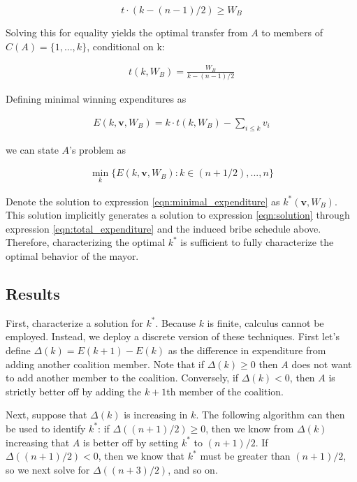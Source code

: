 \documentclass[12pt,a4paper]{article}
\begin{document}
$$t \cdot (k - (n - 1)/2) \geq W_B$$

Solving this for equality yields the optimal transfer from $A$ to members of $C(A) = \{1, ..., k\}$, conditional on k:

\begin{align}
    \label{eqn:common_transfer}
    t(k, W_B) = \frac{W_B}{k - (n - 1)/2}
\end{align}

Defining minimal winning expenditures as

\begin{align}
    \label{eqn:total_expenditure}
    E(k, \mathbf{v}, W_B) = k \cdot t(k, W_B) - \sum_{i \leq k} v_i
\end{align}

we can state $A$'s problem as

\begin{align}
\label{eqn:minimal_expenditure}
\min_k \{E(k, \mathbf{v}, W_B) : k \in {(n + 1/2), ..., n}\}
\end{align}

Denote the solution to expression \ref{eqn:minimal_expenditure} as $k^*(\mathbf{v}, W_B)$. This solution implicitly generates a solution to expression \ref{eqn:solution} through expression \ref{eqn:total_expenditure} and the induced bribe schedule above. Therefore, characterizing the optimal $k^*$ is sufficient to fully characterize the optimal behavior of the mayor.

\subsection*{Results}

First, characterize a solution for $k^*$. Because $k$ is finite, calculus cannot be employed. Instead, we deploy a discrete version of these techniques. First let's define $\Delta(k) = E(k + 1) - E(k)$ as the difference in expenditure from adding another coalition member. Note that if $\Delta(k) \geq 0$ then $A$ does not want to add another member to the coalition. Conversely, if $\Delta(k) < 0$, then $A$ is strictly better off by adding the $k + 1$th member of the coalition.

Next, suppose that $\Delta(k)$ is increasing in $k$. The following algorithm can then be used to identify $k^*$: if $\Delta((n + 1)/2) \geq 0$, then we know from $\Delta(k)$ increasing that $A$ is better off by setting $k^*$ to $(n + 1)/2$. If $\Delta((n + 1)/2) < 0$, then we know that $k^*$ must be greater than $(n + 1)/2$, so we next solve for $\Delta((n + 3)/2)$, and so on.
\end{document}
